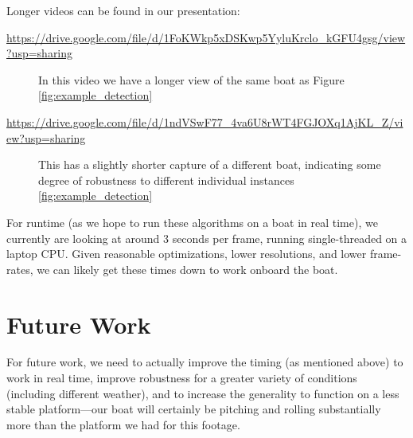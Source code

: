 \documentclass{article}
\begin{document}
Longer videos can be found in our presentation:

\begin{description}
\item[\url{https://drive.google.com/file/d/1FoKWkp5xDSKwp5YyluKrclo_kGFU4gsg/view?usp=sharing}]
  In this video we have a longer view of the same boat as Figure
  \ref{fig:example_detection}
\item[\url{https://drive.google.com/file/d/1ndVSwF77_4va6U8rWT4FGJOXq1AjKL_Z/view?usp=sharing}]
  This has a slightly shorter capture of a different boat, indicating some
  degree of robustness to different individual instances
  \ref{fig:example_detection}
\end{description}

For runtime (as we hope to run these algorithms on a boat in real time),
we currently are looking at around 3 seconds per frame, running single-threaded
on a laptop CPU. Given reasonable optimizations, lower resolutions, and lower
frame-rates, we can likely get these times down to work onboard the boat.

\section{Future Work}

For future work, we need to actually improve the timing (as mentioned above) to
work in real time, improve robustness for a greater variety of conditions
(including different weather), and
to increase the generality to function on a less stable platform---our boat will
certainly be pitching and rolling substantially more than the platform we had
for this footage.
\end{document}
